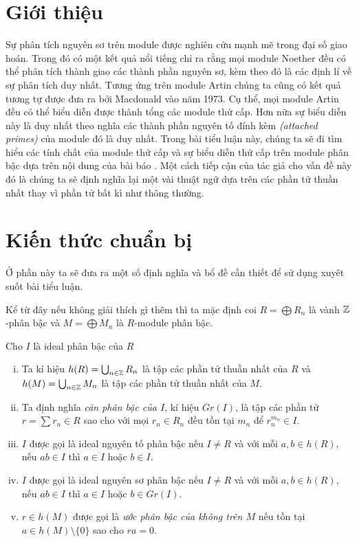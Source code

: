 




\section{Giới thiệu}
Sự phân tích nguyên sơ trên module được nghiên cứu mạnh mẽ trong đại số giao hoán. Trong đó có một kết quả nổi tiếng chỉ ra rằng mọi module Noether đều có thể phân tích thành giao các thành phần nguyên sơ, kèm theo đó là các định lí về sự phân tích duy nhất. Tương ứng trên module Artin chúng ta cũng có kết quả tương tự được đưa ra bởi Macdonald vào năm 1973. Cụ thể, mọi module Artin đều có thể biểu diễn được thành tổng các module thứ cấp. Hơn nữa sự biểu diễn này là duy nhất theo nghĩa các thành phần nguyên tố đính kèm \textit{(attached primes)} của module đó là duy nhất. Trong bài tiểu luận này, chúng ta sẽ đi tìm hiểu các tính chất của module thứ cấp và sự biểu diễn thứ cấp trên module phân bậc dựa trên nội dung của bài báo \cite{AFGraded}. Một cách tiếp cận của tác giả cho vấn đề này đó là chúng ta sẽ định nghĩa lại một vài thuật ngữ dựa trên các phần tử thuần nhất thay vì phần tử bất kì như thông thường.

\section{Kiến thức chuẩn bị}
Ở phần này ta sẽ đưa ra một số định nghĩa và bổ đề cần thiết để sử dụng xuyêt suốt bài tiểu luận.

Kể từ đây nếu không giải thích gì thêm thì ta mặc định coi $R = \bigoplus R_n$ là vành $\mathbb Z$-phân bậc và $M = \bigoplus M_n$ là $R$-module phân bậc.

\begin{define} Cho $I$ là ideal phân bậc của $R$
    \begin{enumerate}[(i)]
        \item Ta kí hiệu $h(R) = \bigcup_{n \in \mathbb Z}R_n$ là tập các phần tử thuần nhất của $R$ và $h(M) = \bigcup_{n \in \mathbb Z}M_n$ là tập các phần tử thuần nhất của $M$.
        \item Ta định nghĩa \textit{căn phân bậc của $I$}, kí hiệu $Gr(I)$, là tập các phần tử $r = \sum r_n \in R$ sao cho với mọi $r_n \in R_n$ đều tồn tại $m_n$ để $r_n^{m_n} \in I$.
        \item $I$ được gọi là ideal nguyên tố phân bậc nếu $I \neq R$ và với mỗi $a,b \in h(R)$, nếu $ab \in I$ thì $a \in I$ hoặc $b \in I$.\item $I$ được gọi là ideal nguyên sơ phân bậc nếu $I \neq R$ và với mỗi $a,b \in h(R)$, nếu $ab \in I$ thì $a \in I$ hoặc $b \in Gr(I)$.
        \item $r \in h(M)$ được gọi là \textit{ước phân bậc của không trên $M$} nếu tồn tại $a \in h(M) \setminus \{0\}$ sao cho $ra = 0$.
    \end{enumerate}
\end{define}

